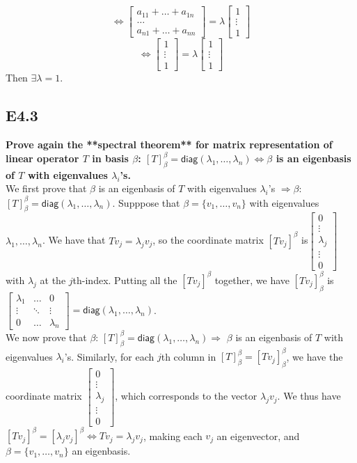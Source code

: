 \documentclass[12pt]{article}
\begin{document}
$$\Leftrightarrow \begin{bmatrix}
a_{11}+\ldots+a_{1n}\\
\ldots\\
a_{n1}+\ldots+a_{nn}
\end{bmatrix}=\lambda
\begin{bmatrix}
1\\
\vdots\\
1
\end{bmatrix}
$$
$$\Leftrightarrow \begin{bmatrix}
1\\
\vdots\\
1
\end{bmatrix}=\lambda
\begin{bmatrix}
1\\
\vdots\\
1
\end{bmatrix}$$
Then $\exists\lambda = 1$.
\subsection*{E4.3}
\textbf{Prove again the **spectral theorem** for matrix representation of linear operator $T$ in basis $\beta$: $[T]_{\beta}^{\beta} = \textsf{diag}(\lambda_1,\dots,\lambda_n) \Leftrightarrow \beta$ is an eigenbasis of $T$ with eigenvalues $\lambda_i$'s.}\\
We first prove that $\beta$ is an eigenbasis of $T$ with eigenvalues $\lambda_i$'s $\Rightarrow \beta$: $[T]_{\beta}^{\beta} = \textsf{diag}(\lambda_1,\dots,\lambda_n)$. Supppose that $\beta = \{v_1,\ldots,v_n\}$ with eigenvalues $\lambda_1,\ldots,\lambda_n$. We have that $Tv_j = \lambda_jv_j$, so the coordinate matrix $[Tv_j]^\beta$ is$ \begin{bmatrix}
0\\
\vdots\\
\lambda_j\\
\vdots\\
0
\end{bmatrix}
$ with $\lambda_j$ at the $j$th-index. Putting all the $[Tv_j]^\beta$ together, we have $[Tv_j]^\beta_\beta$ is $\begin{bmatrix}
\lambda_1 & \ldots & 0\\
\vdots & \ddots & \vdots\\
0 & \ldots & \lambda_n
\end{bmatrix} = \textsf{diag}(\lambda_1,\ldots,\lambda_n)$.\\
We now prove that $\beta$: $[T]_{\beta}^{\beta} = \textsf{diag}(\lambda_1,\dots,\lambda_n)\Rightarrow $ $\beta$ is an eigenbasis of $T$ with eigenvalues $\lambda_i$'s.
Similarly, for each $j$th column in $[T]^\beta_\beta = [Tv_j]^\beta_\beta$, we have the coordinate matrix $\begin{bmatrix}
0\\
\vdots\\
\lambda_j\\
\vdots\\
0
\end{bmatrix}$, which corresponds to the vector $\lambda_jv_j$. We thus have $[Tv_j]^\beta = [\lambda_jv_j]^\beta \Leftrightarrow Tv_j=\lambda_jv_j$, making each $v_j$ an eigenvector, and $\beta = \{v_1,\ldots,v_n\}$ an eigenbasis.
\newpage 
\end{document}
